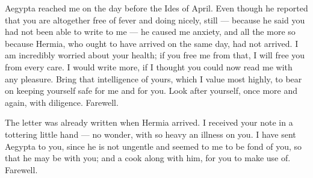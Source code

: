 

 Aegypta reached me on the day before the Ides of April. Even though he reported that you are altogether free of fever and doing nicely, still --- because he said you had not been able to write to me --- he caused me anxiety, and all the more so because Hermia, who ought to have arrived on the same day, had not arrived. I am incredibly worried about your health; if you free me from that, I will free you from every care. I would write more, if I thought you could now read me with any pleasure. Bring that intelligence of yours, which I value most highly, to bear on keeping yourself safe for me and for you. Look after yourself, once more and again, with diligence. Farewell.

 The letter was already written when Hermia arrived. I received your note in a tottering little hand --- no wonder, with so heavy an illness on you. I have sent Aegypta to you, since he is not ungentle and seemed to me to be fond of you, so that he may be with you; and a cook along with him, for you to make use of. Farewell.
